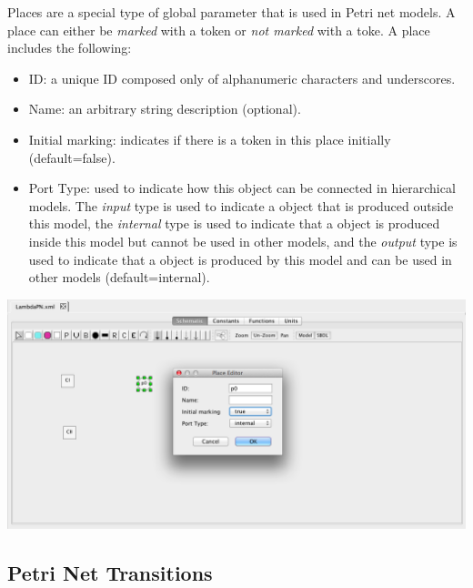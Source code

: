 \documentclass[titlepage,11pt]{article}
\begin{document}
\noindent
Places are a special type of global parameter that is used in Petri net models.  A place can either be \emph{marked} with a token or \emph{not marked} with a toke.  A place includes the following:
\begin{itemize}
\item ID: a unique ID composed only of alphanumeric characters and underscores.
\item Name: an arbitrary string description (optional).
\item Initial marking: indicates if there is a token in this place initially (default=false).
\item Port Type: used to indicate how this object can be connected in hierarchical models.  The \emph{input} type is used to indicate a object that is produced outside this model, the \emph{internal} type is used to indicate that a object is produced inside this model but cannot be used in other models, and the \emph{output} type is used to indicate that a object is produced by this model and can be used in other models (default=internal). 
\end{itemize}

\begin{center}
\includegraphics[width=160mm]{screenshots/place}
\end{center}

\clearpage

\subsection{\label{Transitions}Petri Net Transitions}
\end{document}
